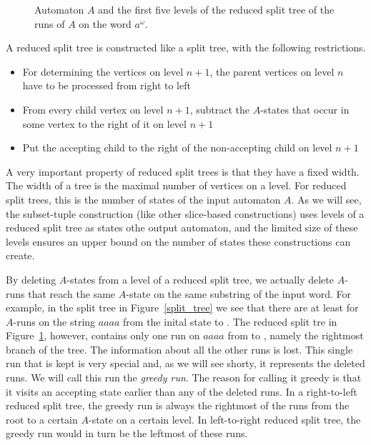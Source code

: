 \begin{figure}
\centering
\ReducedSplitTreeRightLeft
\caption{Automaton $A$ and the first five levels of the reduced split tree of the runs of $A$ on the word $a^\omega$.}
\label{reduced_split_tree}
\end{figure}

A reduced split tree is constructed like a split tree, with the following restrictions.
\begin{itemize}
\item For determining the vertices on level $n+1$, the parent vertices on level $n$ have to be processed from right to left
\item From every child vertex on level $n+1$, subtract the $A$-states that occur in some vertex to the right of it on level $n+1$
\item Put the accepting child to the right of the non-accepting child on level $n+1$
\end{itemize}

A very important property of reduced split trees is that they have a fixed width. The width of a tree is the maximal number of vertices on a level. For reduced split trees, this is the number of states of the input automaton $A$. As we will see, the subset-tuple construction (like other slice-based constructions) uses levels of a reduced split tree as states othe output automaton, and the limited size of these levels ensures an upper bound on the number of states these constructions can create.

By deleting $A$-states from a level of a reduced split tree, we actually delete $A$-runs that reach the same $A$-state on the same substring of the input word. For example, in the split tree in Figure~\ref{split_tree} we see that there are at least for $A$-runs on the string $aaaa$ from the inital state  to . The reduced split tre in Figure~\ref{reduced_split_tree}, however, contains only one run on $aaaa$ from  to , namely the rightmost branch of the tree. The information about all the other runs is lost. This single run that is kept is very special and, as we will see shorty, it represents the deleted runs. We will call this run the \emph{greedy run}. The reason for calling it greedy is that it visits an accepting state earlier than any of the deleted runs. In a right-to-left reduced split tree, the greedy run is always the rightmost of the runs from the root to a certain $A$-state on a certain level. In left-to-right reduced split tree, the greedy run would in turn be the leftmost of these runs.

